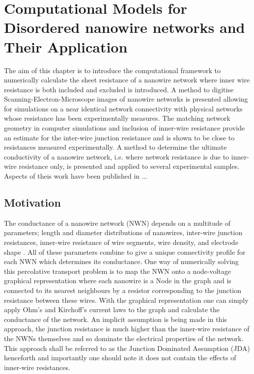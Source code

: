 \chapter{Computational Models for Disordered nanowire networks and Their Application}
The aim of this chapter is to introduce the computational framework to numerically calculate the sheet resistance of a nanowire network where inner wire resistance is both included and excluded is introduced. A method to digitise Scanning-Electron-Microscope images of nanowire networks is presented allowing for simulations on a near identical network connectivity with physical networks whose resistance has been experimentally measures. The matching network geometry in computer simulations and inclusion of inner-wire resistance provide an estimate for the inter-wire junction resistance and is shown to be close to resistances measured experimentally. A method to determine the ultimate conductivity of a nanowire network, i.e. where network resistance is due to inner-wire resistance only, is presented and applied to several experimental samples. Aspects of theis work have been published in ...
\newpage
\section{Motivation}
The conductance of a nanowire network (NWN) depends on a multitude of parameters; length and diameter distributions of nanowires\cite{hecht2006,bergin2012,sorel2012,hicks2009,pike1974}, inter-wire junction resistances\cite{mutiso2013}, inner-wire resistance of wire segments{\cite{zezelj2012}, wire density\cite{balberg1983}}, and electrode shape \cite{fairfield2014}. All of these parameters combine to give a unique connectivity profile for each NWN which determines its conductance. One way of numerically solving this percolative transport problem\cite{kirkpatrick1973} is to map the NWN onto a node-voltage graphical representation where each nanowire is a Node in the graph and is connected to its nearest neighbours by a resistor corresponding to the junction resistance between these wires. With the graphical representation one can simply apply Ohm's and Kirchoff's current laws to the graph and calculate the conductance of the network\cite{graph_book}. An implicit assumption is being made in this approach, the junction resistance is much higher than the inner-wire resistance of the NWNs themselves and so dominate the electrical properties of the network. This approach shall be referred to as the Junction Dominated Assumption (JDA) henceforth and importantly one should note it does not contain the effects of inner-wire resistances.


